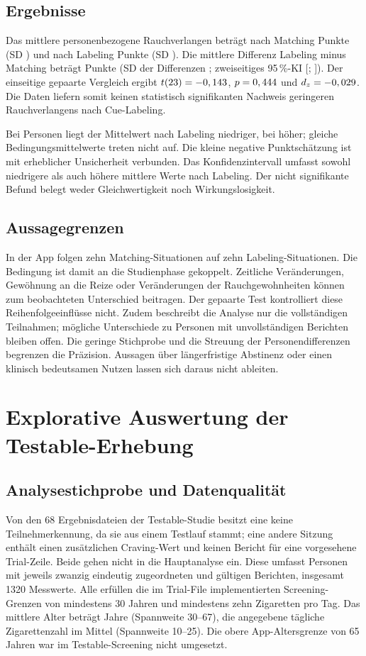 \subsection{Ergebnisse}
Das mittlere personenbezogene Rauchverlangen beträgt nach Matching \AppM{} Punkte (SD \AppSDM{}) und nach Labeling \AppL{} Punkte (SD \AppSDL{}). Die mittlere Differenz Labeling minus Matching beträgt \AppDiff{} Punkte (SD der Differenzen \AppSDDiff{}; zweiseitiges 95\,\%-KI [\AppLower{}; \AppUpper{}]). Der einseitige gepaarte Vergleich ergibt $t(23)=-0,143$, $p=0,444$ und $d_z=-0,029$. Die Daten liefern somit keinen statistisch signifikanten Nachweis geringeren Rauchverlangens nach Cue-Labeling.

Bei \AppNegative{} Personen liegt der Mittelwert nach Labeling niedriger, bei \AppPositive{} höher; gleiche Bedingungsmittelwerte treten nicht auf. Die kleine negative Punktschätzung ist mit erheblicher Unsicherheit verbunden. Das Konfidenzintervall umfasst sowohl niedrigere als auch höhere mittlere Werte nach Labeling. Der nicht signifikante Befund belegt weder Gleichwertigkeit noch Wirkungslosigkeit.

\subsection{Aussagegrenzen}
In der App folgen zehn Matching-Situationen auf zehn Labeling-Situationen. Die Bedingung ist damit an die Studienphase gekoppelt. Zeitliche Veränderungen, Gewöhnung an die Reize oder Veränderungen der Rauchgewohnheiten können zum beobachteten Unterschied beitragen. Der gepaarte Test kontrolliert diese Reihenfolgeeinflüsse nicht. Zudem beschreibt die Analyse nur die vollständigen Teilnahmen; mögliche Unterschiede zu Personen mit unvollständigen Berichten bleiben offen. Die geringe Stichprobe und die Streuung der Personendifferenzen begrenzen die Präzision. Aussagen über längerfristige Abstinenz oder einen klinisch bedeutsamen Nutzen lassen sich daraus nicht ableiten.

\section{Explorative Auswertung der Testable-Erhebung}
\label{sec:testable-auswertung}
\subsection{Analysestichprobe und Datenqualität}
Von den 68 Ergebnisdateien der Testable-Studie besitzt eine keine Teilnehmerkennung, da sie aus einem Testlauf stammt; eine andere Sitzung enthält einen zusätzlichen Craving-Wert und keinen Bericht für eine vorgesehene Trial-Zeile. Beide gehen nicht in die Hauptanalyse ein. Diese umfasst \TestableN{} Personen mit jeweils zwanzig eindeutig zugeordneten und gültigen Berichten, insgesamt 1320 Messwerte. Alle erfüllen die im Trial-File implementierten Screening-Grenzen von mindestens 30 Jahren und mindestens zehn Zigaretten pro Tag. Das mittlere Alter beträgt \TestableAge{} Jahre (Spannweite 30--67), die angegebene tägliche Zigarettenzahl im Mittel \TestableCigs{} (Spannweite 10--25). Die obere App-Altersgrenze von 65 Jahren war im Testable-Screening nicht umgesetzt.


